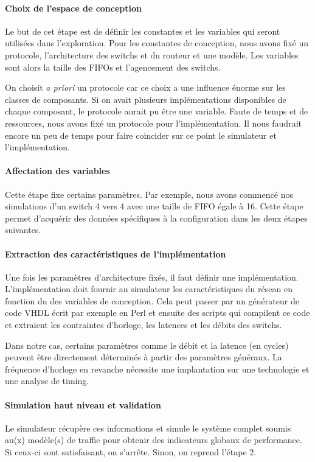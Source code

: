 \documentclass[11pt]{article}
\begin{document}
\paragraph{Choix de l'espace de conception}
Le but de cet étape est de définir les constantes et les variables qui seront utilisées dans l'exploration. Pour les constantes de conception, nous avons fixé un protocole, l'architecture des switchs et du routeur et une modèle. Les variables sont alors la taille des FIFOs et l'agencement des switchs.
 
On choisit \textit{a priori} un protocole car ce choix a une influence énorme sur les classes de composants. Si on avait plusieurs implémentations disponibles de chaque composant, le protocole aurait pu être une variable. Faute de temps et de ressources, nous avons fixé un protocole pour l'implémentation. Il nous faudrait encore un peu de temps pour faire coincider sur ce point le simulateur et l'implémentation.

\paragraph{Affectation des variables}
Cette étape fixe certains paramètres. Par exemple, nous avons commencé nos simulations d'un switch 4 vers 4 avec une taille de FIFO égale à 16. Cette étape permet d'acquérir des données spécifiques à la configuration dans les deux étapes suivantes.

\paragraph{Extraction des caractéristiques de l'implémentation}
Une fois les paramètres d'architecture fixés, il faut définir une implémentation. L'implémentation doit fournir au simulateur les caractéristiques du réseau en fonction du des variables de conception. Cela peut passer par un générateur de code VHDL écrit par exemple en Perl et ensuite des scripts qui compilent ce code et extraient les contraintes d'horloge, les latences et les débits des switchs.

Dans notre cas, certains paramètres comme le débit et la latence (en cycles) peuvent être directement déterminés à partir des paramètres généraux. La fréquence d'horloge en revanche nécessite une implantation sur une technologie et une analyse de timing.

\paragraph{Simulation haut niveau et validation}
Le simulateur récupère ces informations et simule le système complet soumis au(x) modèle(s) de traffic pour obtenir des indicateurs globaux de performance. Si ceux-ci sont satisfaisant, on s'arrête. Sinon, on reprend l'étape 2.
\end{document}

